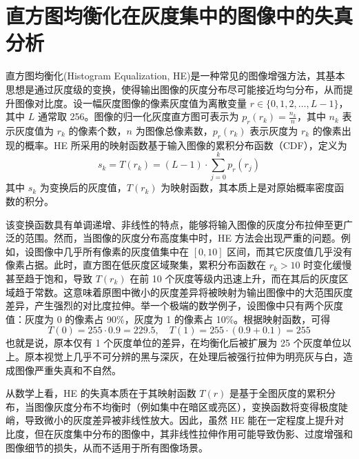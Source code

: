 \documentclass{ctexart}
\begin{document}
\section{直方图均衡化在灰度集中的图像中的失真分析}

直方图均衡化(Histogram Equalization, HE)是一种常见的图像增强方法，其基本思想是通过灰度级的变换，使得输出图像的灰度分布尽可能接近均匀分布，从而提升图像对比度。设一幅灰度图像的像素灰度值为离散变量 $r \in \{0, 1, 2, \dots, L-1\}$，其中 $L$ 通常取 256。图像的归一化灰度直方图可表示为 $p_r(r_k) = \frac{n_k}{n}$，其中 $n_k$ 表示灰度值为 $r_k$ 的像素个数，$n$ 为图像总像素数，$p_r(r_k)$ 表示灰度为 $r_k$ 的像素出现的概率。HE 所采用的映射函数基于输入图像的累积分布函数（CDF），定义为
\[
s_k = T(r_k) = (L - 1) \cdot \sum_{j=0}^{k} p_r(r_j)
\]
其中 $s_k$ 为变换后的灰度值，$T(r_k)$ 为映射函数，其本质上是对原始概率密度函数的积分。

该变换函数具有单调递增、非线性的特点，能够将输入图像的灰度分布拉伸至更广泛的范围。然而，当图像的灰度分布高度集中时，HE 方法会出现严重的问题。例如，设图像中几乎所有像素的灰度值集中在 $[0,10]$ 区间，而其它灰度值几乎没有像素占据。此时，直方图在低灰度区域聚集，累积分布函数在 $r_k > 10$ 时变化缓慢甚至趋于饱和，导致 $T(r_k)$ 在前 10 个灰度等级内迅速上升，而在其后的灰度区域趋于常数。这意味着原图中微小的灰度差异将被映射为输出图像中的大范围灰度差异，产生强烈的对比度拉伸。举一个极端的数学例子，设图像中只有两个灰度值：灰度为 0 的像素占 90\%，灰度为 1 的像素占 10\%。根据映射函数，可得
\[
T(0) = 255 \cdot 0.9 = 229.5, \quad T(1) = 255 \cdot (0.9 + 0.1) = 255
\]
也就是说，原本仅有 1 个灰度单位的差异，在均衡化后被扩展为 25 个灰度单位以上。原本视觉上几乎不可分辨的黑与深灰，在处理后被强行拉伸为明亮灰与白，造成图像严重失真和不自然。

从数学上看，HE 的失真本质在于其映射函数 $T(r)$ 是基于全图灰度的累积分布，当图像灰度分布不均衡时（例如集中在暗区或亮区），变换函数将变得极度陡峭，导致微小的灰度差异被非线性放大。因此，虽然 HE 能在一定程度上提升对比度，但在灰度集中分布的图像中，其非线性拉伸作用可能导致伪影、过度增强和图像细节的损失，从而不适用于所有图像场景。
   \newpage
\end{document}
